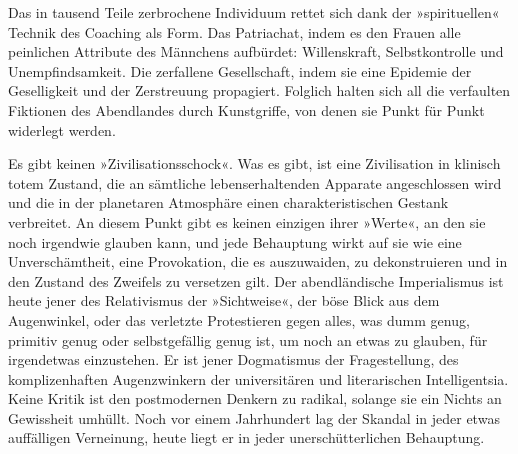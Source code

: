 Das in tausend Teile zerbrochene Individuum rettet sich dank der
»spirituellen« Technik des Coaching als Form. Das Patriachat, indem
es den Frauen alle peinlichen Attribute des Männchens aufbürdet:
Willenskraft, Selbstkontrolle und Unempfindsamkeit. Die zerfallene
Gesellschaft, indem sie eine Epidemie der Geselligkeit und der
Zerstreuung propagiert. Folglich halten sich all die verfaulten
Fiktionen des Abendlandes durch Kunstgriffe, von denen sie Punkt
für Punkt widerlegt werden.
\extrapar{}

Es gibt keinen »Zivilisationsschock«. Was es gibt, ist eine
Zivilisation in klinisch totem Zustand, die an sämtliche
lebenserhaltenden Apparate angeschlossen wird und die in der
planetaren Atmosphäre einen charakteristischen Gestank verbreitet.
An diesem Punkt gibt es keinen einzigen ihrer »Werte«, an den sie
noch irgendwie glauben kann, und jede Behauptung wirkt auf sie wie
eine Unverschämtheit, eine Provokation, die es auszuwaiden, zu
dekonstruieren und in den Zustand des Zweifels zu versetzen gilt.
Der abendländische Imperialismus ist heute jener des Relativismus
der »Sichtweise«, der böse Blick aus dem Augenwinkel, oder das
verletzte Protestieren gegen alles, was dumm genug, primitiv genug
oder selbstgefällig genug ist, um noch an etwas zu glauben, für
irgendetwas einzustehen. Er ist jener Dogmatismus der
Fragestellung, des komplizenhaften Augenzwinkern der universitären
und literarischen Intelligentsia. Keine Kritik ist den postmodernen
Denkern zu radikal, solange sie ein Nichts an Gewissheit umhüllt.
Noch vor einem Jahrhundert lag der Skandal in jeder etwas
auffälligen Verneinung, heute liegt er in jeder unerschütterlichen
Behauptung.
\extrapar{}

